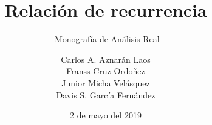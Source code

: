 \documentclass[graybox,envcountchap,sectrefs]{svmono}
\date{2 de mayo del 2019}
\begin{document}
\author{Carlos A. Aznarán Laos\\
Franss Cruz Ordoñez\\
Junior Micha Velásquez\\
Davis S. García Fernández}
\title{Relación de recurrencia}
\subtitle{-- Monografía de Análisis Real--}
\maketitle

\frontmatter%

%
%
%
%
%
%
%
%
%
%

\end{document}

